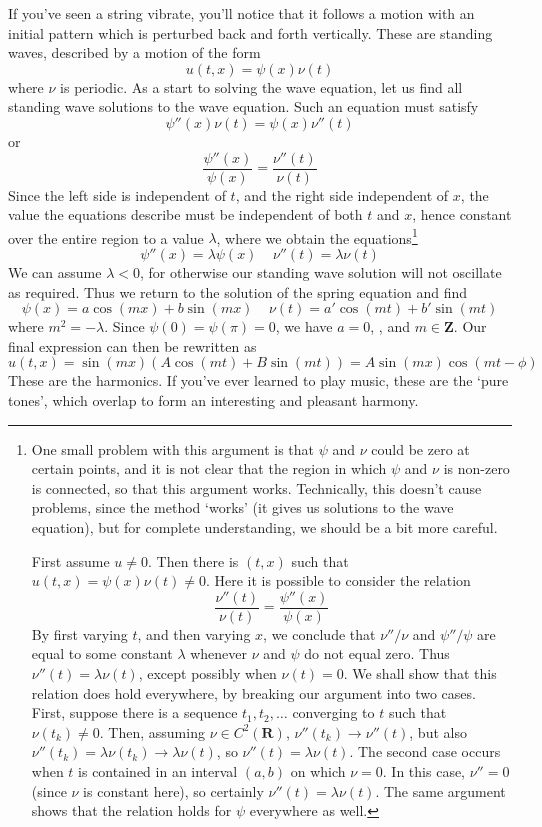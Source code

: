 If you've seen a string vibrate, you'll notice that it follows a motion with an initial pattern which is perturbed back and forth vertically. These are standing waves, described by a motion of the form
%
\[ u(t,x) = \psi(x) \nu(t) \]
%
where $\nu$ is periodic. As a start to solving the wave equation, let us find all standing wave solutions to the wave equation. Such an equation must satisfy
%
\[ \psi''(x) \nu(t) = \psi(x) \nu''(t) \]
%
or
%
\[ \frac{\psi''(x)}{\psi(x)} = \frac{\nu''(t)}{\nu(t)} \]
%
Since the left side is independent of $t$, and the right side independent of $x$, the value the equations describe must be independent of both $t$ and $x$, hence constant over the entire region to a value $\lambda$, where we obtain the equations\footnote{One small problem with this argument is that $\psi$ and $\nu$ could be zero at certain points, and it is not clear that the region in which $\psi$ and $\nu$ is non-zero is connected, so that this argument works. Technically, this doesn't cause problems, since the method `works' (it gives us solutions to the wave equation), but for complete understanding, we should be a bit more careful.

First assume $u \neq 0$. Then there is $(t,x)$ such that $u(t,x) = \psi(x) \nu(t) \neq 0$. Here it is possible to consider the relation
%
\[ \frac{\nu''(t)}{\nu(t)} = \frac{\psi''(x)}{\psi(x)} \]
%
By first varying $t$, and then varying $x$, we conclude that $\nu''/\nu$ and $\psi''/\psi$ are equal to some constant $\lambda$ whenever $\nu$ and $\psi$ do not equal zero. Thus $\nu''(t) = \lambda \nu(t)$, except possibly when $\nu(t) = 0$. We shall show that this relation does hold everywhere, by breaking our argument into two cases. First, suppose there is a sequence $t_1, t_2, \dots$ converging to $t$ such that $\nu(t_k) \neq 0$. Then, assuming $\nu \in C^2(\mathbf{R})$, $\nu''(t_k) \to \nu''(t)$, but also $\nu''(t_k) = \lambda \nu(t_k) \to \lambda \nu(t)$, so $\nu''(t) = \lambda \nu(t)$. The second case occurs when $t$ is contained in an interval $(a,b)$ on which $\nu = 0$. In this case, $\nu'' = 0$ (since $\nu$ is constant here), so certainly $\nu''(t) = \lambda \nu (t)$. The same argument shows that the relation holds for $\psi$ everywhere as well.}
%
\[ \psi''(x) = \lambda \psi(x)\ \ \ \ \ \nu''(t) = \lambda \nu(t) \]
%
We can assume $\lambda < 0$, for otherwise our standing wave solution will not oscillate as required. Thus we return to the solution of the spring equation and find
%
\[ \psi(x) = a \cos(mx) + b \sin(mx) \ \ \ \ \ \nu(t) = a' \cos(mt) + b' \sin(mt) \]
%
where $m^2 = -\lambda$. Since $\psi(0) = \psi(\pi) = 0$, we have $a = 0$, , and $m \in \mathbf{Z}$. Our final expression can then be rewritten as
%
\[ u(t,x) = \sin(mx) (A \cos(mt) + B \sin(mt)) = A \sin(mx) \cos(mt - \phi) \]
%
These are the harmonics. If you've ever learned to play music, these are the `pure tones', which overlap to form an interesting and pleasant harmony.

